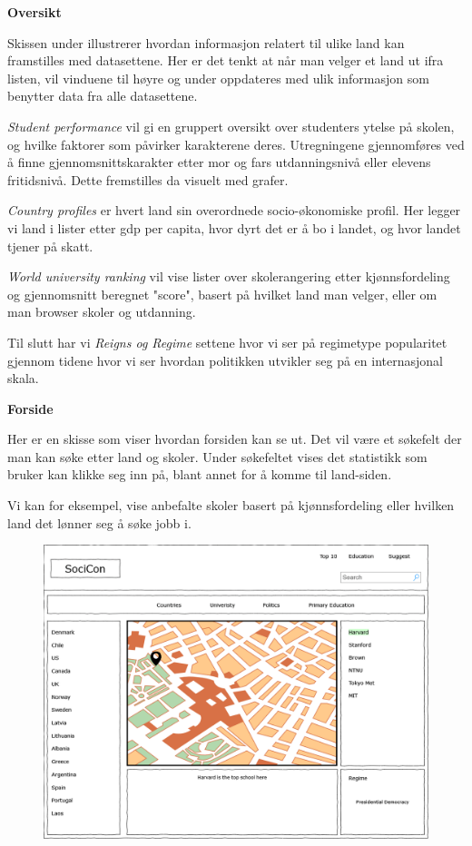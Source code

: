 
\textbf{Oversikt}

Skissen under illustrerer hvordan informasjon relatert til ulike land kan framstilles med datasettene. Her er det tenkt at når man velger et land ut ifra listen, vil vinduene til høyre og under oppdateres med ulik informasjon som benytter data fra alle datasettene.

\textit{Student performance} vil gi en gruppert oversikt over studenters ytelse på skolen, og hvilke faktorer som påvirker karakterene deres. Utregningene gjennomføres ved å finne gjennomsnittskarakter etter mor og fars utdanningsnivå eller elevens fritidsnivå. Dette fremstilles da visuelt med grafer.

\textit{Country profiles} er hvert land sin overordnede socio-økonomiske profil. Her legger vi land i lister etter gdp per capita, hvor dyrt det er å bo i landet, og hvor landet tjener på skatt.

\textit{World university ranking} vil vise lister over skolerangering etter kjønnsfordeling og gjennomsnitt beregnet "score", basert på hvilket land man velger, eller om man browser skoler og utdanning.

Til slutt har vi \textit{Reigns og Regime} settene hvor vi ser på regimetype popularitet gjennom tidene hvor vi ser hvordan politikken utvikler seg på en internasjonal skala.

\textbf{Forside}

Her er en skisse som viser hvordan forsiden kan se ut. Det vil være et søkefelt der man kan søke etter land og skoler. Under søkefeltet vises det statistikk som bruker kan klikke seg inn på, blant annet for å komme til land-siden.

Vi kan for eksempel, vise anbefalte skoler basert på kjønnsfordeling eller hvilken land det lønner seg å søke jobb i.

\FigureCounter
\begin{figure}[H]
    \includegraphics[width=\textwidth]{images/milepael1/forsideBigdata.png}
\end{figure}
